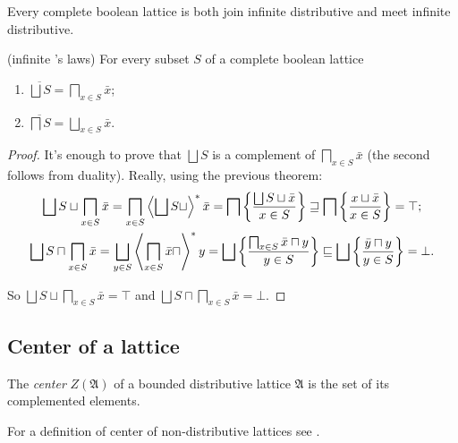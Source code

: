 \begin{cor}\label{bool-inf-distr}
Every complete boolean lattice is both join infinite distributive
and meet infinite distributive.\end{cor}
\begin{thm}
(infinite 's laws) For
every subset $S$ of a complete boolean lattice
\begin{enumerate}
\item $\overline{\bigsqcup S}=\bigsqcap_{x\in S}\bar{x}$;
\item $\overline{\bigsqcap S}=\bigsqcup_{x\in S}\bar{x}$.
\end{enumerate}
\end{thm}
\begin{proof}
It's enough to prove that $\bigsqcup S$ is a complement of $\bigsqcap_{x\in S}\bar{x}$
(the second follows from duality). Really, using the previous theorem:
\begin{gather*}
\bigsqcup S\sqcup\bigsqcap_{x\in S}\bar{x}=\bigsqcap_{x\in S}\rsupfun{\bigsqcup S\sqcup}\bar{x}=\bigsqcap\setcond{\bigsqcup S\sqcup\bar{x}}{x\in S}\sqsupseteq\bigsqcap\setcond{x\sqcup\bar{x}}{x\in S}=\top;\\
\bigsqcup S\sqcap\bigsqcap_{x\in S}\bar{x}=\bigsqcup_{y\in S}\rsupfun{\bigsqcap_{x\in S}\bar{x}\sqcap}y=\bigsqcup\setcond{\bigsqcap_{x\in S}\bar{x}\sqcap y}{y\in S}\sqsubseteq\bigsqcup\setcond{\bar{y}\sqcap y}{y\in S}=\bot.
\end{gather*}


So $\bigsqcup S\sqcup\bigsqcap_{x\in S}\bar{x}=\top$ and $\bigsqcup S\sqcap\bigsqcap_{x\in S}\bar{x}=\bot$.
\end{proof}

\subsection{Center of a lattice}
\begin{defn}
The \emph{center} $Z(\mathfrak{A})$ of a bounded
distributive lattice $\mathfrak{A}$ is the set of its complemented
elements.\end{defn}
\begin{rem}
For a definition of center of non-distributive lattices see \cite{neutralelements}.
\end{rem}

